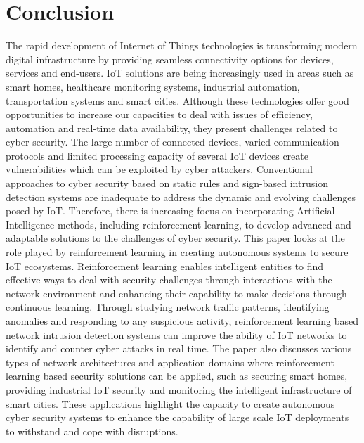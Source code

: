 \documentclass[12pt]{article}
\begin{document}
	\section{Conclusion}
	The rapid development of Internet of Things technologies is transforming modern digital infrastructure by providing seamless connectivity options for devices, services and end-users. IoT solutions are being increasingly used in areas such as smart homes, healthcare monitoring systems, industrial automation, transportation systems and smart cities. Although these technologies offer good opportunities to increase our capacities to deal with issues of efficiency, automation and real-time data availability, they present challenges related to cyber security. The large number of connected devices, varied communication protocols and limited processing capacity of several IoT devices create vulnerabilities which can be exploited by cyber attackers. Conventional approaches to cyber security based on static rules and sign-based intrusion detection systems are inadequate to address the dynamic and evolving challenges posed by IoT. 
Therefore, there is increasing focus on incorporating Artificial Intelligence methods, including reinforcement learning, to develop advanced and adaptable solutions to the challenges of cyber security.
This paper looks at the role played by reinforcement learning in creating autonomous systems to secure IoT ecosystems. Reinforcement learning enables intelligent entities to find effective ways to deal with security challenges through interactions with the network environment and enhancing their capability to make decisions through continuous learning. Through studying network traffic patterns, identifying anomalies and responding to any suspicious activity, reinforcement learning based network intrusion detection systems can improve the ability of IoT networks to identify and counter cyber attacks in real time. The paper also discusses various types of network architectures and application domains where reinforcement learning based security solutions can be applied, such as securing smart homes, providing industrial IoT security and monitoring the intelligent infrastructure of smart cities. These applications highlight the capacity to create autonomous cyber security systems to enhance the capability of large scale IoT deployments to withstand and cope with disruptions.
\end{document}
